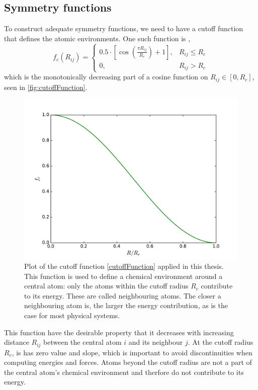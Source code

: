 \documentclass[twoside,english]{uiofysmaster}
\begin{document}
\subsection{Symmetry functions} \label{sec:symmetryFunctions}
To construct adequate symmetry functions, we need to have a cutoff function that defines the atomic environments. 
One such function is \cite{Behler15},
\begin{equation}
 f_c(R_{ij}) = 
\begin{cases}
0.5 \cdot \left[\cos\left(\frac{\pi R_{ij}}{R_c}\right) + 1 \right], & R_{ij} \leq R_c \\
0, & R_{ij} > R_c
\end{cases}
\label{cutoffFunction}
\end{equation}
which is the monotonically decreasing part of a cosine function on $R_{ij} \in [0,R_c]$, seen in \autoref{fig:cutoffFunction}. 
\begin{figure}[H]
\begin{center}
  \includegraphics[width = 0.9\linewidth]{Figures/Theory/cutoffFunction.pdf}
  \caption{Plot of the cutoff function \eqref{cutoffFunction} applied in this thesis. 
	   This function is used to define a chemical environment around a central atom:
           only the atoms within the cutoff radius $R_c$ contribute to its energy. 
           These are called neighbouring atoms. The closer a neighbouring atom is, the larger
           the energy contribution, as is the case for most physical systems.}
  \label{fig:cutoffFunction}
  \end{center}
\end{figure}
This function have the desirable property that it decreases with increasing distance $R_{ij}$ between the central
atom $i$ and its neighbour $j$. At the cutoff radius $R_c$, is has zero value and slope, which is important
to avoid discontinuities when computing energies and forces. Atoms beyond the cutoff radius are not a part of the central
atom's chemical environment and therfore do not contribute to its energy. 
\end{document}
